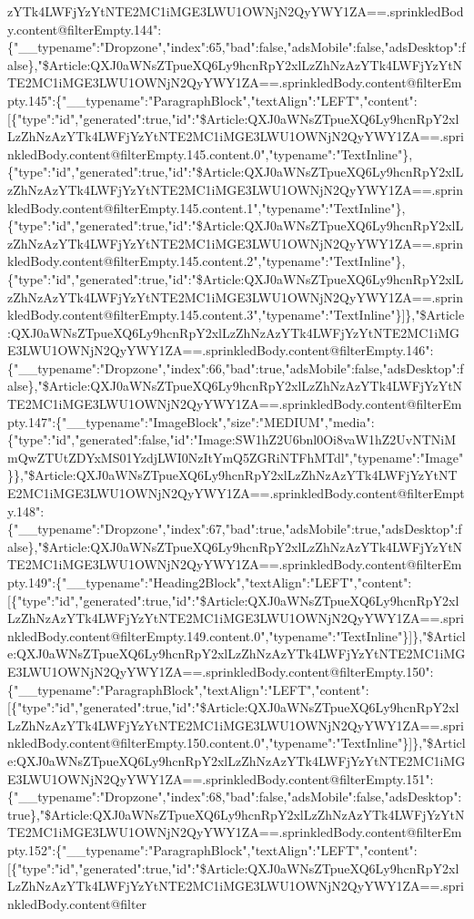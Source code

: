 zYTk4LWFjYzYtNTE2MC1iMGE3LWU1OWNjN2QyYWY1ZA==.sprinkledBody.content@filterEmpty.144":\{"\_\_typename":"Dropzone","index":65,"bad":false,"adsMobile":false,"adsDesktop":false\},"\$Article:QXJ0aWNsZTpueXQ6Ly9hcnRpY2xlLzZhNzAzYTk4LWFjYzYtNTE2MC1iMGE3LWU1OWNjN2QyYWY1ZA==.sprinkledBody.content@filterEmpty.145":\{"\_\_typename":"ParagraphBlock","textAlign":"LEFT","content":{[}\{"type":"id","generated":true,"id":"\$Article:QXJ0aWNsZTpueXQ6Ly9hcnRpY2xlLzZhNzAzYTk4LWFjYzYtNTE2MC1iMGE3LWU1OWNjN2QyYWY1ZA==.sprinkledBody.content@filterEmpty.145.content.0","typename":"TextInline"\},\{"type":"id","generated":true,"id":"\$Article:QXJ0aWNsZTpueXQ6Ly9hcnRpY2xlLzZhNzAzYTk4LWFjYzYtNTE2MC1iMGE3LWU1OWNjN2QyYWY1ZA==.sprinkledBody.content@filterEmpty.145.content.1","typename":"TextInline"\},\{"type":"id","generated":true,"id":"\$Article:QXJ0aWNsZTpueXQ6Ly9hcnRpY2xlLzZhNzAzYTk4LWFjYzYtNTE2MC1iMGE3LWU1OWNjN2QyYWY1ZA==.sprinkledBody.content@filterEmpty.145.content.2","typename":"TextInline"\},\{"type":"id","generated":true,"id":"\$Article:QXJ0aWNsZTpueXQ6Ly9hcnRpY2xlLzZhNzAzYTk4LWFjYzYtNTE2MC1iMGE3LWU1OWNjN2QyYWY1ZA==.sprinkledBody.content@filterEmpty.145.content.3","typename":"TextInline"\}{]}\},"\$Article:QXJ0aWNsZTpueXQ6Ly9hcnRpY2xlLzZhNzAzYTk4LWFjYzYtNTE2MC1iMGE3LWU1OWNjN2QyYWY1ZA==.sprinkledBody.content@filterEmpty.146":\{"\_\_typename":"Dropzone","index":66,"bad":true,"adsMobile":false,"adsDesktop":false\},"\$Article:QXJ0aWNsZTpueXQ6Ly9hcnRpY2xlLzZhNzAzYTk4LWFjYzYtNTE2MC1iMGE3LWU1OWNjN2QyYWY1ZA==.sprinkledBody.content@filterEmpty.147":\{"\_\_typename":"ImageBlock","size":"MEDIUM","media":\{"type":"id","generated":false,"id":"Image:SW1hZ2U6bnl0Oi8vaW1hZ2UvNTNiMmQwZTUtZDYxMS01YzdjLWI0NzItYmQ5ZGRiNTFhMTdl","typename":"Image"\}\},"\$Article:QXJ0aWNsZTpueXQ6Ly9hcnRpY2xlLzZhNzAzYTk4LWFjYzYtNTE2MC1iMGE3LWU1OWNjN2QyYWY1ZA==.sprinkledBody.content@filterEmpty.148":\{"\_\_typename":"Dropzone","index":67,"bad":true,"adsMobile":true,"adsDesktop":false\},"\$Article:QXJ0aWNsZTpueXQ6Ly9hcnRpY2xlLzZhNzAzYTk4LWFjYzYtNTE2MC1iMGE3LWU1OWNjN2QyYWY1ZA==.sprinkledBody.content@filterEmpty.149":\{"\_\_typename":"Heading2Block","textAlign":"LEFT","content":{[}\{"type":"id","generated":true,"id":"\$Article:QXJ0aWNsZTpueXQ6Ly9hcnRpY2xlLzZhNzAzYTk4LWFjYzYtNTE2MC1iMGE3LWU1OWNjN2QyYWY1ZA==.sprinkledBody.content@filterEmpty.149.content.0","typename":"TextInline"\}{]}\},"\$Article:QXJ0aWNsZTpueXQ6Ly9hcnRpY2xlLzZhNzAzYTk4LWFjYzYtNTE2MC1iMGE3LWU1OWNjN2QyYWY1ZA==.sprinkledBody.content@filterEmpty.150":\{"\_\_typename":"ParagraphBlock","textAlign":"LEFT","content":{[}\{"type":"id","generated":true,"id":"\$Article:QXJ0aWNsZTpueXQ6Ly9hcnRpY2xlLzZhNzAzYTk4LWFjYzYtNTE2MC1iMGE3LWU1OWNjN2QyYWY1ZA==.sprinkledBody.content@filterEmpty.150.content.0","typename":"TextInline"\}{]}\},"\$Article:QXJ0aWNsZTpueXQ6Ly9hcnRpY2xlLzZhNzAzYTk4LWFjYzYtNTE2MC1iMGE3LWU1OWNjN2QyYWY1ZA==.sprinkledBody.content@filterEmpty.151":\{"\_\_typename":"Dropzone","index":68,"bad":false,"adsMobile":false,"adsDesktop":true\},"\$Article:QXJ0aWNsZTpueXQ6Ly9hcnRpY2xlLzZhNzAzYTk4LWFjYzYtNTE2MC1iMGE3LWU1OWNjN2QyYWY1ZA==.sprinkledBody.content@filterEmpty.152":\{"\_\_typename":"ParagraphBlock","textAlign":"LEFT","content":{[}\{"type":"id","generated":true,"id":"\$Article:QXJ0aWNsZTpueXQ6Ly9hcnRpY2xlLzZhNzAzYTk4LWFjYzYtNTE2MC1iMGE3LWU1OWNjN2QyYWY1ZA==.sprinkledBody.content@filter